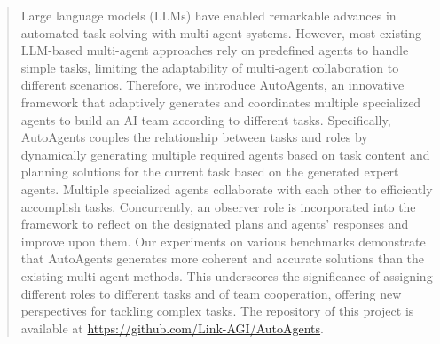 \begin{abstract}
Large language models (LLMs) have enabled remarkable advances in automated task-solving with multi-agent systems. 
However, most existing LLM-based multi-agent approaches rely on predefined agents to handle simple tasks, limiting the adaptability of multi-agent collaboration to different scenarios.
Therefore, we introduce AutoAgents, an innovative framework that adaptively generates and coordinates multiple specialized agents to build an AI team according to different tasks.
Specifically, AutoAgents couples the relationship between tasks and roles by dynamically generating multiple required agents based on task content and planning solutions for the current task based on the generated expert agents.
Multiple specialized agents collaborate with each other to efficiently accomplish tasks. 
Concurrently, an observer role is incorporated into the framework to reflect on the designated plans and agents' responses and improve upon them.
Our experiments on various benchmarks demonstrate that AutoAgents generates more coherent and accurate solutions than the existing multi-agent methods.
This underscores the significance of assigning different roles to different tasks and of team cooperation, offering new perspectives for tackling complex tasks.
The repository of this project is available at \href{https://github.com/Link-AGI/AutoAgents}{https://github.com/Link-AGI/AutoAgents}.
\end{abstract}